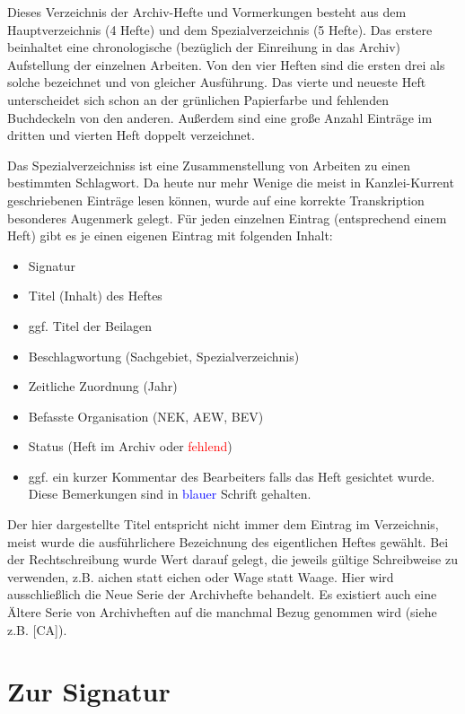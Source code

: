\documentclass[a4paper]{scrbook}
\begin{document}
Dieses \glqq Verzeichnis der Archiv-Hefte und Vormerkungen\grqq{} besteht aus dem \glqq Hauptverzeichnis\grqq{} (4 Hefte) und dem \glqq{}Spezialverzeichnis\grqq{} (5 Hefte). Das erstere beinhaltet eine chronologische (bezüglich der Einreihung in das Archiv) Aufstellung der einzelnen Arbeiten. Von den vier Heften sind die ersten drei als solche bezeichnet und von gleicher Ausführung. Das vierte und neueste Heft unterscheidet sich schon an der grünlichen Papierfarbe und fehlenden Buchdeckeln von den anderen. Außerdem sind eine große Anzahl Einträge im dritten und vierten Heft doppelt verzeichnet. 

Das Spezialverzeichniss ist eine Zusammenstellung von Arbeiten zu einen bestimmten Schlagwort.
Da heute nur mehr Wenige die meist in Kanzlei-Kurrent geschriebenen Einträge lesen können, wurde auf eine korrekte Transkription besonderes Augenmerk gelegt.  Für jeden einzelnen Eintrag (entsprechend einem Heft) gibt es je einen eigenen Eintrag mit folgenden Inhalt:

\begin{itemize}
\item Signatur
\item Titel (Inhalt) des Heftes
\item ggf. Titel der Beilagen 
\item Beschlagwortung (Sachgebiet, Spezialverzeichnis)
\item Zeitliche Zuordnung (Jahr)
\item Befasste Organisation (NEK, AEW, BEV)
\item Status (Heft im Archiv oder \textcolor{red}{fehlend})
\item ggf. ein kurzer Kommentar des Bearbeiters falls das Heft gesichtet wurde. Diese Bemerkungen sind in \textcolor{blue}{blauer} Schrift gehalten.
\end{itemize}

Der hier dargestellte Titel entspricht nicht immer dem Eintrag im Verzeichnis, meist wurde die ausführlichere Bezeichnung des eigentlichen Heftes gewählt. Bei der Rechtschreibung wurde Wert darauf gelegt, die jeweils gültige Schreibweise zu verwenden, z.B. {\glqq}aichen{\grqq} statt {\glqq}eichen{\grqq} oder {\glqq}Wage{\grqq} statt {\glqq}Waage{\grqq}. Hier wird ausschließlich die {\glqq}Neue Serie{\grqq} der Archivhefte behandelt. Es existiert auch eine {\glqq}Ältere Serie{\grqq} von Archivheften auf die manchmal Bezug genommen wird (siehe z.B. [CA]).

\section{Zur Signatur}
\end{document}
